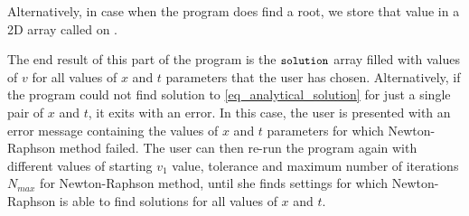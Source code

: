 Alternatively, in case when the program does find a root, we store that value in a 2D array called  on .

The end result of this part of the program is the $\texttt{\small solution}$ array filled with values of $v$ for all values of $x$ and $t$ parameters that the user has chosen. Alternatively, if the program could not find solution to \autoref{eq_analytical_solution} for just a single pair of $x$ and $t$, it exits with an error. In this case, the user is presented with an error message containing the values of $x$ and $t$ parameters for which Newton-Raphson method failed. The user can then re-run the program again with different values of starting $v_1$ value, tolerance and maximum number of iterations $N_{max}$ for Newton-Raphson method, until she finds settings for which Newton-Raphson is able to find solutions for all values of $x$ and $t$.
